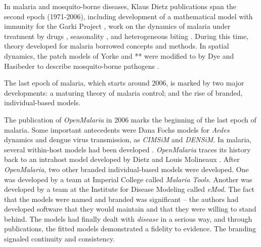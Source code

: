 \documentclass[
]{book}
\begin{document}
In malaria and mosquito-borne diseases, Klaus Dietz publications span the second epoch (1971-2006), including development of a mathematical model with immunity for the Garki Project \autocite{DietzK1974GarkiModel}, work on the dynamics of malaria under treatment by drugs \autocite{DietzK1975ModelsParasitic}, seasonality \autocite{DietzK1976Seasonality}, and heterogeneous biting \autocite{DietzK1980ModelsVectorborne,DietzK1988EpidemiologicalModels}. During this time, theory developed for malaria borrowed concepts and methods. In spatial dynamics, the patch models of Yorke and ** were modified to by Dye and Hasibeder to describe mosquito-borne pathogens \autocite{DyeC1986PopulationDynamics,HasibederG1988PopulationDynamics}.

The last epoch of malaria, which starts around 2006, is marked by two major developments: a maturing theory of malaria control; and the rise of branded, individual-based models.

The publication of \emph{OpenMalaria} in 2006 marks the beginning of the last epoch of malaria. Some important antecedents were Dana Fochs models for \emph{Aedes} dynamics and dengue virus transmission, as \emph{CIMSiM} and \emph{DENSiM}. In malaria, several within-host models had been developed \autocite{MolineauxL1999ReviewIntrahost,MolineauxL2001PlasmodiumFalciparum}. \emph{OpenMalaria} traces its history back to an intrahost model developed by Dietz and Louis Molineaux \autocite{MolineauxL2001PlasmodiumFalciparum}. After \emph{OpenMalaria,} two other branded individual-based models were developed. One was developed by a team at Imperial College called \emph{Malaria Tools.} Another was developed by a team at the Institute for Disease Modeling called \emph{eMod.} The fact that the models were named and branded was significant -- the authors had developed software that they would maintain and that they were willing to stand behind. The models had finally dealt with \emph{disease} in a serious way, and through publications, the fitted models demonstrated a fidelity to evidence. The branding signaled continuity and consistency.
\end{document}
